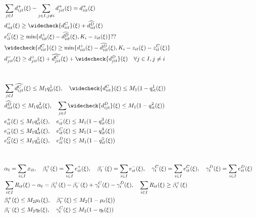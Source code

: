 \documentclass[10pt]{article}
\begin{document}
\begin{align*}
    &\sum_{j \in I}d^+_{ijt}(\xi) - \sum_{j \in I, j \neq i}d^+_{jit}(\xi) = d^+_{iit}(\xi) &\\
    &d^+_{iit}(\xi) \geq \widecheck{d^{C}_{iit}}(\xi) + \widehat{d^{D}_{iit}}(\xi) &\\
    &e^C_{it}(\xi) \geq \text{min} \{d^+_{iit}(\xi) - \widehat{d^{D}_{iit}}(\xi), K_i - z_{it}(\xi) \} ??&\\
    &\widecheck{d^C_{iit}}(\xi) \geq \text{min} \{d^+_{iit}(\xi) - \widehat{d^{D}_{iit}}(\xi), K_i - z_{it}(\xi) - z^C_{it}(\xi) \} &\\
    &d^-_{jit}(\xi) \geq d^+_{jit}(\xi) + \widehat{d^{C}_{jit}}(\xi) + \widecheck{d^{D}_{jit}}(\xi) \quad \forall j \in I, j \neq i &\\
    &&\\ 
    &&\\
    &\sum_{j \in I}\widehat{d^{C}_{ijt}}(\xi) \leq M_1 q^1_{it}(\xi), \quad \widecheck{d^{C}_{iit}}(\xi) \leq M_1 (1 - q^1_{it}(\xi)) &\\
    &\widehat{d^{D}_{iit}}(\xi) \leq M_1 q^2_{it}(\xi), \quad \sum_{j \in I}\widecheck{d^{D}_{ijt}}(\xi) \leq M_1 (1 - q^2_{it}(\xi)) &\\
    &e^{+}_{it}(\xi) \leq M_1 q^3_{it}(\xi), \quad e^{-}_{it}(\xi) \leq M_1 (1 - q^3_{it}(\xi)) &\\
    &e^{-}_{it}(\xi) \leq M_1 q^4_{it}(\xi), \quad e^{C}_{it}(\xi) \leq M_1 (1 - q^4_{it}(\xi)) &\\
    &e^{C}_{it}(\xi) \leq M_1 q^5_{it}(\xi), \quad e^{D}_{it}(\xi) \leq M_1 (1 - q^5_{it}(\xi)) &\\
    &&\\ 
    &&\\
    &\alpha_t = \sum_{i\in I}x_{it}, \quad \beta_t^+(\xi) = \sum_{i\in I}e^+_{it}(\xi), \quad \beta_t^-(\xi) = \sum_{i\in I}e^-_{it}(\xi), \quad \gamma^C_t(\xi) = \sum_{i\in I}e^C_{it}(\xi), \quad \gamma^D_t(\xi) = \sum_{i\in I}e^D_{it}(\xi)&\\
    &\sum_{i \in I} R_{it}(\xi) - \alpha_t = \beta^+_t(\xi) - \beta^-_t(\xi) + \gamma^C_{t}(\xi) - \gamma^D_{t}(\xi), \quad \sum_{i\in I}R_{it}(\xi) \geq \beta_{t}^{+}(\xi)&\\ 
    &\beta^+_t(\xi) \le M_2 \mu_t(\xi), \quad \beta^-_t(\xi) \le M_2 (1 - \mu_t(\xi)) &\\
    &\beta^-_t(\xi) \le M_2 \eta_t(\xi), \quad \gamma^C_t(\xi) \le M_2 (1 - \eta_t(\xi)) &
\end{align*}
\end{document}
